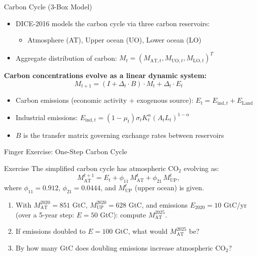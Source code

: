 \documentclass[aspectratio=169,11pt]{beamer}
\begin{document}
\begin{frame}{Carbon Cycle (3-Box Model)}
\small
\begin{itemize}
    \item DICE-2016 models the carbon cycle via three carbon reservoirs:
    \begin{itemize}
        \item Atmosphere (AT), Upper ocean (UO), Lower ocean (LO)
    \end{itemize}
    \item Aggregate distribution of carbon: $M_t = (M_{\mathrm{AT},t}, M_{\mathrm{UO},t}, M_{\mathrm{LO},t})^T$
\end{itemize}

\vspace{0.2cm}
\textbf{Carbon concentrations evolve as a linear dynamic system:}
\[
M_{t+1} = (I + \Delta_t \cdot B) \cdot M_t + \Delta_t \cdot E_t
\]

\begin{itemize}
    \item Carbon emissions (economic activity + exogenous source): $E_t = E_{\mathrm{ind},t} + E_{\mathrm{Land}}$
    \item Industrial emissions: $E_{\mathrm{ind},t} = (1-\mu_t)\sigma_t K_t^{\alpha}(A_t L_t)^{1-\alpha}$
    \item $B$ is the transfer matrix governing exchange rates between reservoirs
\end{itemize}
\end{frame}

\begin{frame}{\exercisepause{} Finger Exercise: One-Step Carbon Cycle}
\begin{exampleblock}{Exercise}
The simplified carbon cycle has atmospheric CO$_2$ evolving as:
\[
M_{\text{AT}}^{t+1} = E_t + \phi_{11}\, M_{\text{AT}}^{t} + \phi_{21}\, M_{\text{UP}}^{t},
\]
where $\phi_{11} = 0.912$, $\phi_{21} = 0.0444$, and $M_{\text{UP}}^t$ (upper ocean) is given.
\begin{enumerate}
    \item With $M_{\text{AT}}^{2020} = 851$ GtC, $M_{\text{UP}}^{2020} = 628$ GtC, and emissions $E_{2020} = 10$ GtC/yr (over a 5-year step: $E = 50$ GtC): compute $M_{\text{AT}}^{2025}$.
    \item If emissions doubled to $E = 100$ GtC, what would $M_{\text{AT}}^{2025}$ be?
    \item By how many GtC does doubling emissions increase atmospheric CO$_2$?
\end{enumerate}
\end{exampleblock}
\end{frame}
\end{document}

